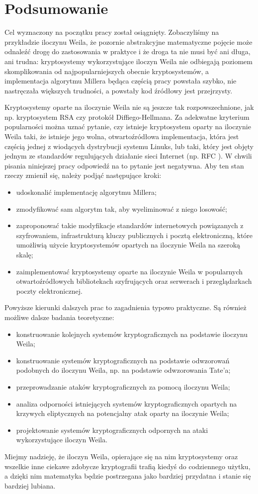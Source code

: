 \chapter*{Podsumowanie}

\noindent
Cel wyznaczony na początku pracy został osiągnięty.
Zobaczyliśmy na przykładzie iloczynu Weila,
że pozornie abstrakcyjne matematyczne pojęcie
może odnaleźć drogę do zastosowania w praktyce
i że droga ta nie musi być ani długa, ani trudna:
kryptosystemy wykorzystujące iloczyn Weila
nie odbiegają poziomem skomplikowania
od najpopularniejszych obecnie kryptosystemów,
a implementacja algorytmu Millera będąca częścią pracy
powstała szybko, nie nastręczała większych trudności,
a powstały kod źródłowy jest przejrzysty.

\noindent
Kryptosystemy oparte na iloczynie Weila nie są jeszcze tak rozpowszechnione,
jak np. kryptosystem RSA czy protokół Diffiego-Hellmana.
Za adekwatne kryterium popularności można uznać pytanie,
czy istnieje kryptosystem oparty na iloczynie Weila taki,
że istnieje jego wolna, otwartoźródłowa implementacja,
która jest częścią jednej z wiodących dystrybucji systemu Linuks,
lub taki,
który jest objęty jednym ze standardów regulujących działanie
sieci Internet (np. RFC \cite{rfc}).
W chwili pisania niniejszej pracy odpowiedź na to pytanie jest negatywna.
Aby ten stan rzeczy zmienił się,
należy podjąć następujące kroki:
\begin{itemize}
\item
udoskonalić implementację algorytmu Millera;
\item
zmodyfikować sam algorytm tak, aby wyeliminować z niego losowość;
\item
zaproponować takie modyfikacje standardów internetowych
powiązanych z szyfrowaniem,
infrastrukturą kluczy publicznych
i pocztą elektroniczną,
które umożliwią użycie kryptosystemów opartych na iloczynie Weila
na szeroką skalę;
\item
zaimplementować kryptosystemy oparte na iloczynie Weila
w popularnych otwartoźródłowych bibliotekach szyfrujących
oraz serwerach i przeglądarkach poczty elektronicznej.
\end{itemize}

\noindent
Powyższe kierunki dalszych prac to zagadnienia typowo praktyczne.
Są również możliwe dalsze badania teoretyczne:
\begin{itemize}
\item
konstruowanie kolejnych systemów kryptograficznych
na podstawie iloczynu Weila;
\item
konstruowanie systemów kryptograficznych
na podstawie odwzorowań podobnych do iloczynu Weila,
np. na podstawie odwzorowania Tate'a;
\item
przeprowadzanie ataków kryptograficznych za pomocą iloczynu Weila;
\item
analiza odporności istniejących systemów kryptograficznych
opartych na krzywych eliptycznych
na potencjalny atak oparty na iloczynie Weila;
\item
projektowanie systemów kryptograficznych odpornych na ataki
wykorzystujące iloczyn Weila.
\end{itemize}

\noindent
Miejmy nadzieję, że iloczyn Weila,
opierające się na nim kryptosystemy
oraz wszelkie inne ciekawe zdobycze kryptografii
trafią kiedyś do codziennego użytku,
a dzięki nim matematyka będzie postrzegana jako bardziej przydatna
i stanie się bardziej lubiana.
